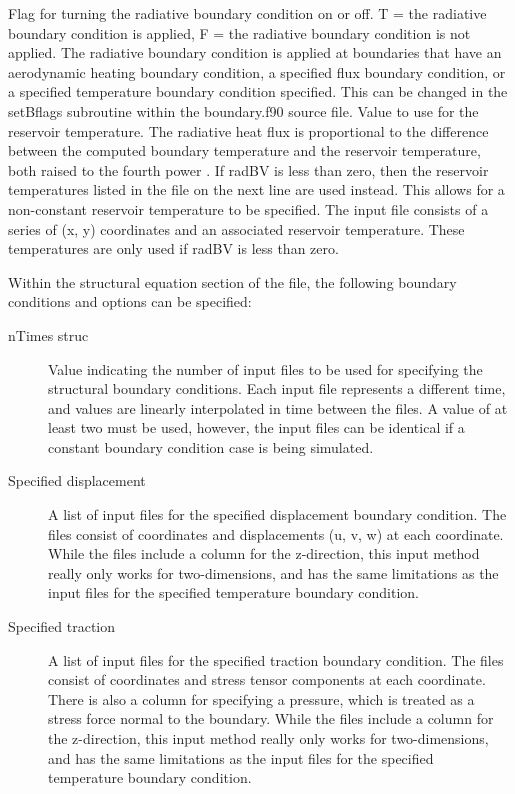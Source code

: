 \documentclass[]{article}
\begin{document}
\begin{description}
 \subitem [LRAD] Flag for turning the radiative boundary condition on or off. T = the radiative boundary condition is applied, F = the radiative boundary condition is not applied. The radiative boundary condition is applied at boundaries that have an aerodynamic heating boundary condition, a specified flux boundary condition, or a specified temperature boundary condition specified. This can be changed in the setBflags subroutine within the boundary.f90 source file.
 \subitem [radBV] Value to use for the reservoir temperature. The radiative heat flux is proportional to the difference between the computed boundary temperature and the reservoir temperature, both raised to the fourth power \cite{amar_thesis}. If radBV is less than zero, then the reservoir temperatures listed in the file on the next line are used instead. This allows for a non-constant reservoir temperature to be specified.
  The input file consists of a series of (x, y) coordinates and an associated reservoir temperature. These temperatures are only used if radBV is less than zero.
\end{description}

Within the structural equation section of the file, the following boundary conditions and options can be specified:
\begin{description}
 \item[nTimes struc] Value indicating the number of input files to be used for specifying the structural boundary conditions. Each input file represents a different time, and values are linearly interpolated in time between the files. A value of at least two must be used, however, the input files can be identical if a constant boundary condition case is being simulated.
 \item[Specified displacement] A list of input files for the specified displacement boundary condition.  The files consist of coordinates and displacements (u, v, w) at each coordinate. While the files include a column for the z-direction, this input method really only works for two-dimensions, and has the same limitations as the input files for the specified temperature boundary condition. 
 \item[Specified traction] A list of input files for the specified traction boundary condition. The files consist of coordinates and stress tensor components at each coordinate. There is also a column for specifying a pressure, which is treated as a stress force normal to the boundary. While the files include a column for the z-direction, this input method really only works for two-dimensions, and has the same limitations as the input files for the specified temperature boundary condition. 
\end{description}
\end{document}
